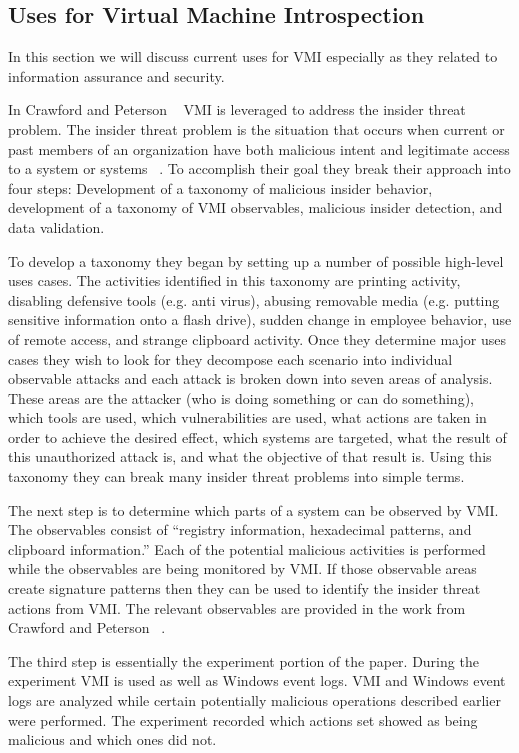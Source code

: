 \subsection{Uses for Virtual Machine Introspection}
In this section we will discuss current uses for VMI especially as they related to information assurance and security. 

In Crawford and Peterson ~\cite{crawford_insider_2013} VMI is leveraged to address the insider threat problem.  The insider threat problem is the situation that occurs when current or past members of an organization have both malicious intent and legitimate access to a system or systems ~\cite{rushby_critical_1994}. To accomplish their goal they break their approach into four steps: Development of a taxonomy of malicious insider behavior, development of a taxonomy of VMI observables, malicious insider detection, and data validation. 

To develop a taxonomy they began by setting up a number of possible high-level uses cases. The activities identified in this taxonomy are printing activity, disabling defensive tools (e.g. anti virus), abusing removable media (e.g. putting sensitive information onto a flash drive), sudden change in employee behavior, use of remote access, and strange clipboard activity. Once they determine major uses cases they wish to look for they decompose each scenario into individual observable attacks and each attack is broken down into seven areas of analysis. These areas are the attacker (who is doing something or can do something), which tools are used, which vulnerabilities are used, what actions are taken in order to achieve the desired effect, which systems are targeted, what the result of this unauthorized attack is, and what the objective of that result is. Using this taxonomy they can break many insider threat problems into simple terms. 

The next step is to determine which parts of a system can be observed by VMI. The observables consist of ``registry information, hexadecimal patterns, and clipboard information.'' Each of the potential malicious activities is performed while the observables are being monitored by VMI. If those observable areas create signature patterns then they can be used to identify the insider threat actions from VMI. The relevant observables are provided in the work from Crawford and Peterson ~\cite{crawford_insider_2013}. 

The third step is essentially the experiment portion of the paper. During the experiment VMI is used as well as Windows event logs. VMI and Windows event logs are analyzed while certain potentially malicious operations described earlier were performed. The experiment recorded which actions set showed as being malicious and which ones did not. 

